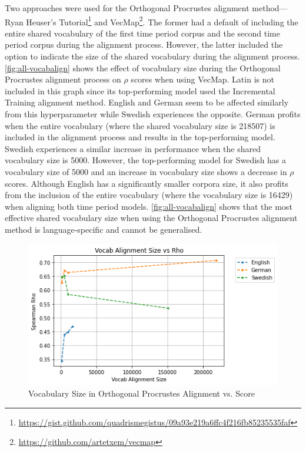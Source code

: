 Two approaches were used for the Orthogonal Procrustes alignment method—Ryan Heuser’s Tutorial\footnote{\url{https://gist.github.com/quadrismegistus/09a93e219a6ffc4f216fb85235535faf}} and VecMap\footnote{\url{https://github.com/artetxem/vecmap}}. The former had a default of including the entire shared vocabulary of the first time period corpus and the second time period corpus during the alignment process. However, the latter included the option to indicate the size of the shared vocabulary during the alignment process. \autoref{fig:all-vocabalign} shows the effect of vocabulary size during the Orthogonal Procrustes alignment process on $\rho$ scores when using VecMap. Latin is not included in this graph since its top-performing model used the Incremental Training alignment method. English and German seem to be affected similarly from this hyperparameter while Swedish experiences the opposite. German profits when the entire vocabulary (where the shared vocabulary size is 218507) is included in the alignment process and results in the top-performing model. Swedish experiences a similar increase in performance when the shared vocabulary size is 5000. However, the top-performing model for Swedish has a vocabulary size of 5000 and an increase in vocabulary size shows a decrease in $\rho$ scores. Although English has a significantly smaller corpora size, it also profits from the inclusion of the entire vocabulary (where the vocabulary size is 16429) when aligning both time period models. \autoref{fig:all-vocabalign} shows that the most effective shared vocabulary size when using the Orthogonal Procrustes alignment method is language-specific and cannot be generalised.

\begin{figure}[h]
  \centering
  \includegraphics[width=.8\linewidth]{sections/figures/vocabalignment_all.png}
  \caption{Vocabulary Size in Orthogonal Procrustes Alignment vs. Score}
  \label{fig:all-vocabalign}
\end{figure}

